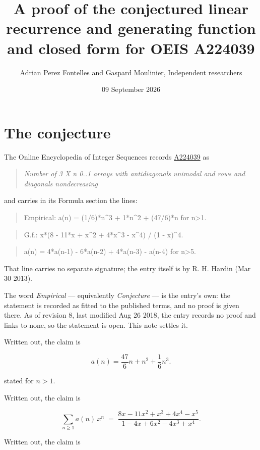 \documentclass[11pt]{article}
\title{A proof of the conjectured linear recurrence and generating function and closed form for OEIS A224039}
\author{Adrian Perez Fontelles and Gaspard Moulinier, Independent researchers}
\date{09 September 2026}
\theoremstyle{definition}
\begin{document}
\maketitle
\section{The conjecture}

The Online Encyclopedia of Integer Sequences records \href{https://oeis.org/A224039}{A224039} as

\begin{quote}\itshape Number of 3 X n 0..1 arrays with antidiagonals unimodal and rows and diagonals nondecreasing\end{quote}

and carries in its Formula section the lines:

\begin{quote}\ttfamily Empirical: a(n) = (1/6)*n\textasciicircum{}3 + 1*n\textasciicircum{}2 + (47/6)*n for n>1.\end{quote}

\begin{quote}\ttfamily G.f.: x*(8 - 11*x + x\textasciicircum{}2 + 4*x\textasciicircum{}3 - x\textasciicircum{}4) / (1 - x)\textasciicircum{}4.\end{quote}

\begin{quote}\ttfamily a(n) = 4*a(n-1) - 6*a(n-2) + 4*a(n-3) - a(n-4) for n>5.\end{quote}

That line carries no separate signature; the entry itself is by R. H. Hardin (Mar 30 2013).

The word {\itshape Empirical} --- equivalently {\itshape Conjecture} --- is the entry's own: the statement is recorded as fitted to the published terms, and no proof is given there. As of revision 8, last modified Aug 26 2018, the entry records no proof and links to none, so the statement is open. This note settles it.

Written out, the claim is

\[a(n) = \frac{47}{6}n + n^{2} + \frac{1}{6}n^{3}.\]

stated for $n > 1$.

Written out, the claim is

\[\sum_{n \ge 1} a(n)\,x^n \;=\; \frac{8x - 11x^{2} + x^{3} + 4x^{4} - x^{5}}{1 - 4x + 6x^{2} - 4x^{3} + x^{4}}.\]

Written out, the claim is
\end{document}
